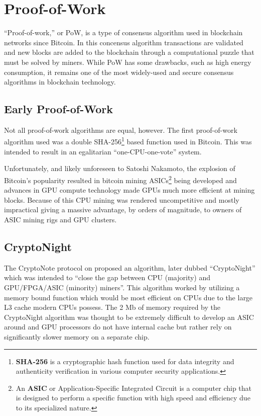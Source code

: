 \section{Proof-of-Work}
``Proof-of-work,'' or PoW, is a type of consensus algorithm used in blockchain networks since Bitcoin\cite{wikipedia_crypto}. In this concensus algorithm transactions are validated and new blocks are added to the blockchain through a computational puzzle that must be solved by miners\cite{bitcoin_whitepaper}. While PoW has some drawbacks, such as high energy consumption, it remains one of the most widely-used and secure consensus algorithms in blockchain technology\cite{concensus_algorithms}.

\subsection{Early Proof-of-Work}
Not all proof-of-work algorithms are equal, however. The first proof-of-work algorithm used was a double SHA-256\footnote{\textbf{SHA-256} is a cryptographic hash function used for data integrity and authenticity verification in various computer security applications.} based function used in Bitcoin\cite{bitcoin_whitepaper}. This was intended to result in an egalitarian ``one-CPU-one-vote'' system\cite{bitcoin_whitepaper}.

Unfortunately, and likely unforeseen to Satoshi Nakamoto, the explosion of Bitcoin's popularity resulted in bitcoin mining ASICs\footnote{An \textbf{ASIC} or Application-Specific Integrated Circuit is a computer chip that is designed to perform a specific function with high speed and efficiency due to its specialized nature\cite{glossary}.} being developed and advances in GPU compute technology made GPUs much more efficient at mining blocks. Because of this CPU mining was rendered uncompetitive and mostly impractical giving a massive advantage, by orders of magnitude, to owners of ASIC mining rigs and GPU clusters\cite{randomx_article}.

\subsection{CryptoNight}
The CryptoNote protocol on proposed an algorithm, later dubbed ``CryptoNight'' which was intended to ``close the gap between CPU (majority) and GPU/FPGA/ASIC (minority) miners''\cite{CryptoNote}. This algorithm worked by utilizing a memory bound function which would be most efficient on CPUs due to the large L3 cache modern CPUs possess\cite{CryptoNote}. The 2 Mb of memory required by the CryptoNight algorithm was thought to be extremely difficult to develop an ASIC around and GPU processors do not have internal cache but rather rely on significantly slower memory on a separate chip\cite{CryptoNote}.

